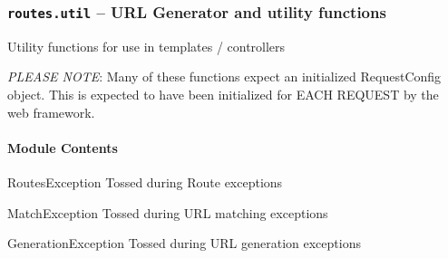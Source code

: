 \documentclass[letterpaper,10pt,english]{manual}
\begin{document}
\resetcurrentobjects
\hypertarget{--doc-modules/util}{}

\subsubsection{\texttt{routes.util} -- URL Generator and utility functions}
\hypertarget{module-routes.util}{}
\modulesynopsis{}
Utility functions for use in templates / controllers

\emph{PLEASE NOTE}: Many of these functions expect an initialized RequestConfig
object. This is expected to have been initialized for EACH REQUEST by the web
framework.


\paragraph{Module Contents}

\hypertarget{routes.util.RoutesException}{}\begin{excdesc}{RoutesException}
Tossed during Route exceptions
\end{excdesc}

\hypertarget{routes.util.MatchException}{}\begin{excdesc}{MatchException}
Tossed during URL matching exceptions
\end{excdesc}

\hypertarget{routes.util.GenerationException}{}\begin{excdesc}{GenerationException}
Tossed during URL generation exceptions
\end{excdesc}
\end{document}
